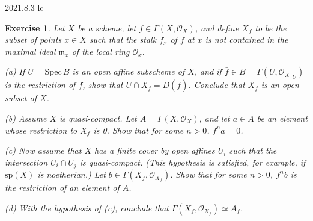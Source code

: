 \documentclass{amsart}
\newtheorem{exe}{Exercise}[subsection]
\theoremstyle{remark}\newtheorem{rmk}[theorem]{Remark}
\begin{document}
2021.8.3 lc
\begin{exe}
	\label{2.2.16}
	Let $X$ be a scheme, let $f\in\Gamma(X,\mathcal{O}_X)$, and define $X_f$ to be the subset of points $x\in X$ such that the stalk $f_x$ of $f$ at $x$ is not contained in the maximal ideal $\mathfrak{m}_x$ of the local ring $\mathcal{O}_x$.
	
	(a) If $U=\mathrm{Spec}\,B$ is an open \emph{affine} subscheme of $X$, and if $\bar{f}\in B=\Gamma(U,\mathcal{O}_X|_U)$ is the restriction of $f$, show that $U\cap X_f=D(\bar{f})$. Conclude that $X_f$ is an open subset of $X$.
	
	(b) Assume $X$ is quasi-compact. Let $A=\Gamma(X,\mathcal{O}_X)$, and let $a\in A$ be an element whose restriction to $X_f$ is 0. Show that for some $n>0$, $f^na=0$.
	
	(c) Now assume that $X$ has a finite cover by open affines $U_i$ such that the intersection $U_i\cap U_j$ is quasi-compact. (This hypothesis is satisfied, for example, if $\mathrm{sp}(X)$ is noetherian.) Let $b\in\Gamma(X_f,\mathcal{O}_{X_f})$. Show that for some $n>0$, $f^nb$ is the restriction of an element of $A$.
	
	(d) With the hypothesis of (c), conclude that $\Gamma(X_f,\mathcal{O}_{X_f})\simeq A_f$.
\end{exe}
\end{document}
